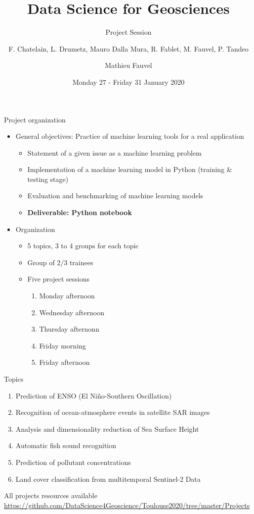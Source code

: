 \documentclass[pressentation,10pt,aspectratio=1610, xcolor=table]{beamer}
\author{F. Chatelain, L. Drumetz, Mauro Dalla Mura, R. Fablet, M. Fauvel, P. Tandeo}
\date{Monday 27 - Friday 31 January 2020}
\title{Data Science for Geosciences}
\subtitle{Project Session}
\author[Mathieu Fauvel]{Mathieu Fauvel}
\begin{document}
\maketitle

\begin{frame}[label={sec:orge8dc8d7}]{Project organization}
\begin{itemize}
\item General objectives: Practice of machine learning tools for a real application
\begin{itemize}
\item Statement of a given issue as a machine learning problem
\item Implementation of a machine learning model in Python (training \& testing stage)
\item Evaluation and benchmarking of machine learning models
\item \textbf{Deliverable: Python notebook}
\end{itemize}

\item Organization
\begin{itemize}
\item 5 topics, 3 to 4 groups for each topic
\item Group of 2/3 trainees
\item Five project sessions
\begin{enumerate}
\item Monday afternoon
\item Wednesday afternoon
\item Thursday afternonn
\item Friday morning
\item Friday afternoon
\end{enumerate}
\end{itemize}
\end{itemize}
\end{frame}

\begin{frame}[label={sec:org1d76aea}]{Topics}
\begin{enumerate}
\item Prediction of ENSO (El Niño-Southern Oscillation)
\item Recognition of ocean-atmosphere events in satellite SAR images
\item Analysis and dimensionality reduction of Sea Surface Height
\item Automatic fish sound recognition
\item Prediction of pollutant concentrations
\item Land cover classification from multitemporal Sentinel-2 Data
\end{enumerate}

\begin{center}
All projects resources available
\url{https://github.com/DataScience4Geoscience/Toulouse2020/tree/master/Projects}
\end{center}
\end{frame}
\end{document}
